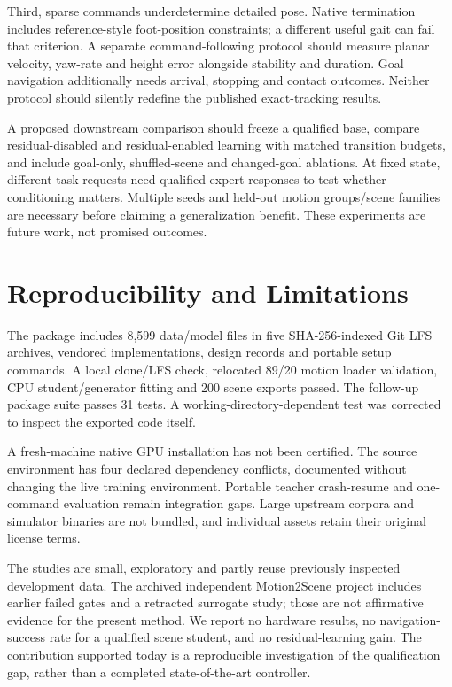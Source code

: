 \documentclass[10pt,twocolumn]{article}
\begin{document}
Third, sparse commands underdetermine detailed pose. Native termination includes reference-style foot-position constraints; a different useful gait can fail that criterion. A separate command-following protocol should measure planar velocity, yaw-rate and height error alongside stability and duration. Goal navigation additionally needs arrival, stopping and contact outcomes. Neither protocol should silently redefine the published exact-tracking results.

A proposed downstream comparison should freeze a qualified base, compare residual-disabled and residual-enabled learning with matched transition budgets, and include goal-only, shuffled-scene and changed-goal ablations. At fixed state, different task requests need qualified expert responses to test whether conditioning matters. Multiple seeds and held-out motion groups/scene families are necessary before claiming a generalization benefit. These experiments are future work, not promised outcomes.

\section{Reproducibility and Limitations}
The package includes 8,599 data/model files in five SHA-256-indexed Git LFS archives, vendored implementations, design records and portable setup commands. A local clone/LFS check, relocated 89/20 motion loader validation, CPU student/generator fitting and 200 scene exports passed. The follow-up package suite passes 31 tests. A working-directory-dependent test was corrected to inspect the exported code itself.

A fresh-machine native GPU installation has not been certified. The source environment has four declared dependency conflicts, documented without changing the live training environment. Portable teacher crash-resume and one-command evaluation remain integration gaps. Large upstream corpora and simulator binaries are not bundled, and individual assets retain their original license terms.

The studies are small, exploratory and partly reuse previously inspected development data. The archived independent Motion2Scene project includes earlier failed gates and a retracted surrogate study; those are not affirmative evidence for the present method. We report no hardware results, no navigation-success rate for a qualified scene student, and no residual-learning gain. The contribution supported today is a reproducible investigation of the qualification gap, rather than a completed state-of-the-art controller.
\end{document}
